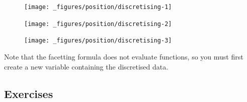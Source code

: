 \begin{figure}[H]
  \texttt{[image: \_figures/position/discretising-1]}%
\end{figure}

\begin{Shaded}
\begin{Highlighting}[]
\OperatorTok{+}\StringTok{ }\NormalTok{(}\OperatorTok{~} \NormalTok{)}
\end{Highlighting}
\end{Shaded}

\begin{figure}[H]
  \texttt{[image: \_figures/position/discretising-2]}%
\end{figure}

\begin{Shaded}
\begin{Highlighting}[]
\OperatorTok{+}\StringTok{ }\NormalTok{(}\OperatorTok{~} \NormalTok{)}
\end{Highlighting}
\end{Shaded}

\begin{figure}[H]
  \texttt{[image: \_figures/position/discretising-3]}
\end{figure}

Note that the facetting formula does not evaluate functions, so you must
first create a new variable containing the discretised data.

\hypertarget{exercises}{%
\subsection{Exercises}\label{exercises}}

